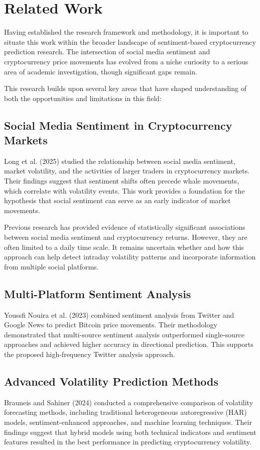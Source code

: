 \documentclass[11pt,twocolumn]{article}
\begin{document}
\section{Related Work}
Having established the research framework and methodology, it is important to situate this work within the broader landscape of sentiment-based cryptocurrency prediction research. The intersection of social media sentiment and cryptocurrency price movements has evolved from a niche curiosity to a serious area of academic investigation, though significant gaps remain.

This research builds upon several key areas that have shaped understanding of both the opportunities and limitations in this field:

\subsection{\textbf{Social Media Sentiment in Cryptocurrency Markets}}
Long et al. (2025) studied the relationship between social media sentiment, market volatility, and the activities of larger traders in cryptocurrency markets. Their findings suggest that sentiment shifts often precede whale movements, which correlate with volatility events. This work provides a foundation for the hypothesis that social sentiment can serve as an early indicator of market movements.

Previous research has provided evidence of statistically significant associations between social media sentiment and cryptocurrency returns. However, they are often limited to a daily time scale. It remains uncertain whether and how this approach can help detect intraday volatility patterns and incorporate information from multiple social platforms.

\subsection{\textbf{Multi-Platform Sentiment Analysis}}
Youssfi Nouira et al. (2023) combined sentiment analysis from Twitter and Google News to predict Bitcoin price movements. Their methodology demonstrated that multi-source sentiment analysis outperformed single-source approaches and achieved higher accuracy in directional prediction. This supports the proposed high-frequency Twitter analysis approach.


\subsection{\textbf{Advanced Volatility Prediction Methods}}
Brauneis and Sahiner (2024) conducted a comprehensive comparison of volatility forecasting methods, including traditional heterogeneous autoregressive (HAR) models, sentiment-enhanced approaches, and machine learning techniques. Their findings suggest that hybrid models using both technical indicators and sentiment features resulted in the best performance in predicting cryptocurrency volatility.
\end{document}
